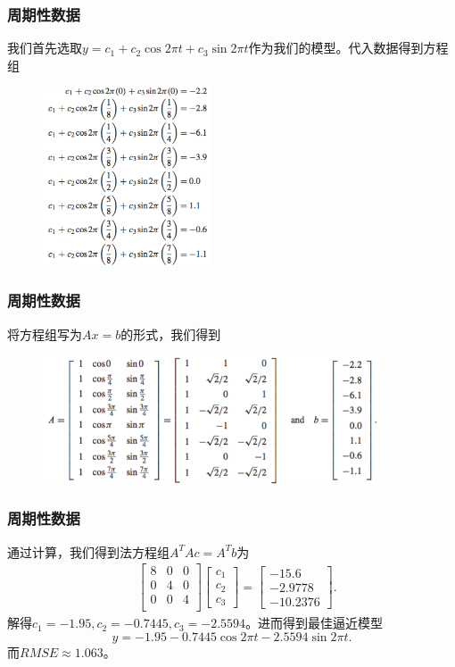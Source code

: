 \documentclass[10pt]{beamer}
\begin{document}
\begin{frame}
\frametitle{周期性数据}
我们首先选取$y = c_1 + c_2 \cos 2\pi t + c_3 \sin 2\pi t$作为我们的模型。代入数据得到方程组
\begin{figure}
\includegraphics[width=5cm]{figs/4-2-1_Perriodic_Data-2} 
\end{figure}
\end{frame}


\begin{frame}
\frametitle{周期性数据}
将方程组写为$Ax = b$的形式，我们得到
\begin{figure}
\includegraphics[width=10cm]{figs/4-2-1_Perriodic_Data-3} 
\end{figure}
\end{frame}


\begin{frame}
\frametitle{周期性数据}
通过计算，我们得到法方程组$A^TA c = A^Tb$为
\begin{align}
&\left[ \begin{array}{ccc}
     8    & 0   & 0\\
     0    &   4 & 0\\
     0    & 0  & 4\\                   
            \end{array} \right] 
\left[ \begin{array}{c} 
      c_1 \\ c_2 \\ c_3 \end{array} \right] 
=
\left[ \begin{array}{c}
      -15.6 \\ -2.9778 \\ -10.2376   \end{array} \right] .
\end{align}
解得$c_1 = -1.95, c_2 = -0.7445, c_3 = -2.5594$。进而得到最佳逼近模型
\begin{equation}
y = -1.95 - 0.7445 \cos 2 \pi t - 2.5594 \sin 2\pi t.
\end{equation}
而$RMSE \approx 1.063$。
\end{frame}
\end{document}
